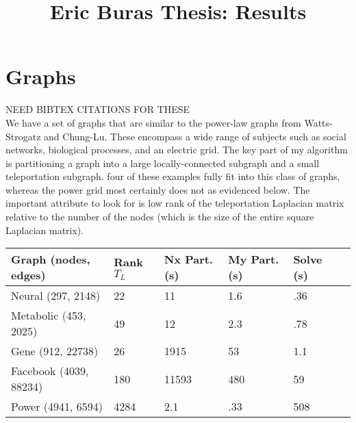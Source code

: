 \documentclass{article}
\begin{document}
\title{Eric Buras Thesis: Results}

\maketitle

\section{Graphs}
NEED BIBTEX CITATIONS FOR THESE\\
We have a set of graphs that are similar to the power-law graphs from Watts-Strogatz and Chung-Lu. These encompass a wide range of subjects such as social networks, biological processes, and an electric grid. The key part of my algorithm is partitioning a graph into a large locally-connected subgraph and a small teleportation subgraph. four of these examples fully fit into this class of graphs, whereas the power grid most certainly does not as evidenced below. The important attribute to look for is low rank of the teleportation Laplacian matrix relative to the number of the nodes (which is the size of the entire square Laplacian matrix).


\begin{center}
\renewcommand{\arraystretch}{1.5}
    \begin{tabular}{ | l | l | l | l | l | l |}
    \hline
    Graph (nodes, edges) & Rank $T_L$ & Nx Part. (s) & My Part. (s) & Solve (s) \\ \hline
    Neural (297, 2148) & 22 & 11 & 1.6 & .36 \\ \hline
    Metabolic (453, 2025) & 49 & 12 & 2.3 & .78 \\  \hline
    Gene (912, 22738) & 26 & 1915 & 53 & 1.1 \\ \hline
    Facebook (4039, 88234) & 180 & 11593 & 480 & 59 \\ \hline
    Power (4941, 6594) & 4284 & 2.1 & .33 & 508 \\ 
    \hline
    \end{tabular}
\end{center}
\end{document}

